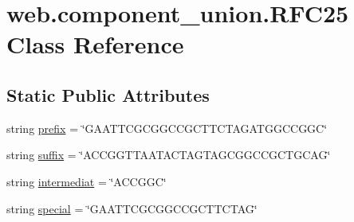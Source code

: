 \hypertarget{classweb_1_1component__union_1_1_r_f_c25}{\section{web.\-component\-\_\-union.\-R\-F\-C25 Class Reference}
\label{classweb_1_1component__union_1_1_r_f_c25}
}
\subsection*{Static Public Attributes}
\begin{DoxyCompactItemize}
\item 
string \hyperlink{classweb_1_1component__union_1_1_r_f_c25_a587bc92d42da35b284da4ed8640671b4}{prefix} = \char`\"{}G\-A\-A\-T\-T\-C\-G\-C\-G\-G\-C\-C\-G\-C\-T\-T\-C\-T\-A\-G\-A\-T\-G\-G\-C\-C\-G\-G\-C\char`\"{}
\item 
string \hyperlink{classweb_1_1component__union_1_1_r_f_c25_aa03490fe92d2f1fcd5d2e80ff4e7f0ef}{suffix} = \char`\"{}A\-C\-C\-G\-G\-T\-T\-A\-A\-T\-A\-C\-T\-A\-G\-T\-A\-G\-C\-G\-G\-C\-C\-G\-C\-T\-G\-C\-A\-G\char`\"{}
\item 
string \hyperlink{classweb_1_1component__union_1_1_r_f_c25_aa0147ee39e138732307cb519eb0f1bd2}{intermediat} = \char`\"{}A\-C\-C\-G\-G\-C\char`\"{}
\item 
string \hyperlink{classweb_1_1component__union_1_1_r_f_c25_a8a8f68d525379ed3db9ab285a202d4fc}{special} = \char`\"{}G\-A\-A\-T\-T\-C\-G\-C\-G\-G\-C\-C\-G\-C\-T\-T\-C\-T\-A\-G\char`\"{}
\end{DoxyCompactItemize}



